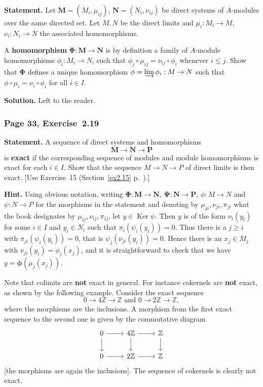\documentclass[12pt,letterpaper]{article}%
\newcommand{\Ker}{\operatorname{Ker}}\newcommand{\Coker}{\operatorname{Coker}}
\newcommand{\nn}{\noindent}
\newcommand{\Z}{\mathbb Z}
\begin{document}
\textbf{Statement.} Let $\mathbf M=(M_i,\mu_{ij})$, $\mathbf N=(N_i,\nu_{ij})$ be direct systems of $A$-modules over the same directed set. Let $M,N$ be the direct limits and $\mu_i:M_i\to M$, $\nu_i:N_i\to N$ the associated homomorphisms.

A \textbf{homomorphism} $\mathbf\Phi:\mathbf M\to\mathbf N$ is by definition a family of $A$-module homomorphisms $\phi_i:M_i\to N_i$ such that $\phi_j\circ\mu_{ij}=\nu_{ij}\circ\phi_i$ whenever $i\le j$. Show that $\mathbf\Phi$ defines a unique homomorphism $\phi=\varinjlim\phi_i:M\to N$ such that $\phi\circ\mu_i=\nu_i\circ\phi_i$ for all $i\in I$.

\nn\textbf{Solution.} Left to the reader.%

\subsubsection{Page 33, Exercise~2.19}%

\textbf{Statement.} A sequence of direct systems and homomorphisms
$$
\mathbf M\to\mathbf N\to\mathbf P
$$ 
is \textbf{exact} if the corresponding sequence of modules and module homomorphisms is exact for each $i\in I$. Show that the sequence $M\to N\to P$ of direct limits is then exact. [Use Exercise~15 (Section~\ref{ex2.15} p.~\pageref{ex2.15}).]

\nn\textbf{Hint.} Using obvious notation, writing $\mathbf\Phi:\mathbf M\to\mathbf N$, $\mathbf\Psi:\mathbf N\to\mathbf P$, $\phi:M\to N$ and $\psi:N\to P$ for the morphisms in the statement and denoting by $\mu_{ji},\nu_{ji},\pi_{ji}$ what the book designates by $\mu_{ij},\nu_{ij},\pi_{ij}$, let $y\in\Ker\psi$. Then $y$ is of the form $\nu_i(y_i)$ for some $i\in I$ and $y_i\in N_i$ such that $\pi_i(\psi_i(y_i))=0$. Thus there is a $j\ge i$ with $\pi_{ji}(\psi_i(y_i))=0$, that is $\psi_j(\nu_{ji}(y_i))=0$. Hence there is an $x_j\in M_j$ with $\nu_{ji}(y_i)=\phi_j(x_j)$, and it is straightforward to check that we have $y=\mathbf\phi(\mu_j(x_j))$.

Note that colimits are \textbf{not} exact in general. For instance cokernels are \textbf{not} exact, as shown by the following example. Consider the exact sequence 
$$
0\to 4\Z\to\Z\text{ and }0\to 2\Z\to\Z,
$$ 
where the morphisms are the inclusions. A morphism from the first exact sequence to the second one is given by the commutative diagram 
\[\begin{tikzcd}
	0 & {4\mathbb Z} & {\mathbb Z} \\
	0 & {2\mathbb Z} & {\mathbb Z}
	\arrow[from=1-1, to=1-2]
	\arrow[from=1-2, to=1-3]
	\arrow[from=1-1, to=2-1]
	\arrow[from=1-2, to=2-2]
	\arrow[from=1-3, to=2-3]
	\arrow[from=2-1, to=2-2]
	\arrow[from=2-2, to=2-3]
\end{tikzcd}\]
[the morphisms are again the inclusions]. The sequence of cokernels is clearly not exact.
\end{document}
